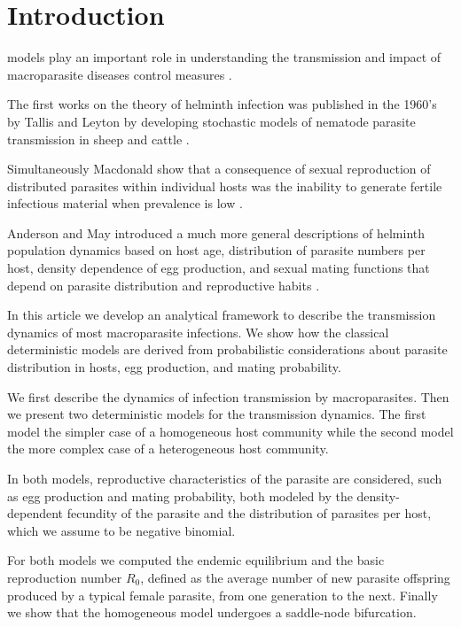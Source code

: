 \documentclass[eng]{MMSB-class-eng}
\begin{document}
\newpage
\section{Introduction}
 models play an important role in understanding the transmission and impact of macroparasite diseases control measures \citep{anderson1992infectious,anderson2014coverage,truscott2016soil}.

The first works on the theory of helminth infection was published in the 1960's by Tallis and Leyton by developing stochastic models of nematode parasite transmission in sheep and cattle \citep{leyton1968stochastic,tallis1966stochastic,tallis1969stochastic}.

Simultaneously Macdonald show that a consequence of sexual reproduction of distributed parasites within individual hosts was the inability to generate fertile infectious material when prevalence is low \citep{macdonald1965dynamics}.


{\color{red}
Anderson and May introduced a much more general descriptions of helminth population dynamics based on host age, distribution of parasite numbers per host, density dependence of egg production, and sexual mating functions that depend on parasite distribution and reproductive habits \citep{anderson1982population,anderson1985helminth,anderson1992infectious}.
}

{\color{red}
In this article we develop an analytical framework to describe the transmission dynamics of most macroparasite infections. We show how the classical deterministic models are derived from probabilistic considerations about parasite distribution in hosts, egg production, and mating probability. 


We first describe the dynamics of infection transmission by macroparasites. 
Then we present two deterministic models for the transmission dynamics. The first model the simpler case of  a homogeneous host community while the second model the more complex case of a heterogeneous host community.
}

In both models, reproductive characteristics of the parasite are considered, such as egg production and mating probability, both modeled by the density-dependent fecundity of the parasite and the distribution of parasites per host, which we assume to be negative binomial.	


{\color{red}
For both models we computed the endemic equilibrium  and the basic reproduction number $R_0$, defined  as the average number of new parasite offspring produced by a typical 
female parasite, from one generation to the next. Finally  we show that the homogeneous model undergoes a saddle-node bifurcation. 
}
\end{document}
